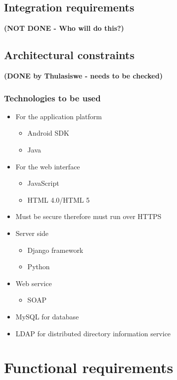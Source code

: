 \documentclass[11pt,a4paper]{article}
\begin{document}
\subsection{Integration requirements}
\textbf{(NOT DONE - Who will do this?)}\\

	

\subsection{Architectural constraints}
\textbf{(DONE by Thulasiswe - needs to be checked)}\\
\subsubsection{Technologies to be used}
	\begin{itemize}
		\item For the application platform
		\begin{itemize}
			\item Android SDK
			\item Java
		\end{itemize}
		\item For the web interface
		\begin{itemize}
			\item JavaScript
			\item HTML 4.0/HTML 5
		\end{itemize}
		\item Must be secure therefore must run over HTTPS
		\item Server side
		\begin{itemize}
			\item Django framework
			\item Python
		\end{itemize}
		\item Web service
		\begin{itemize}
			\item SOAP
		\end{itemize}
		\item MySQL for database
		\item LDAP for distributed directory information service
	\end{itemize}
	
\section{Functional requirements}
\end{document}
